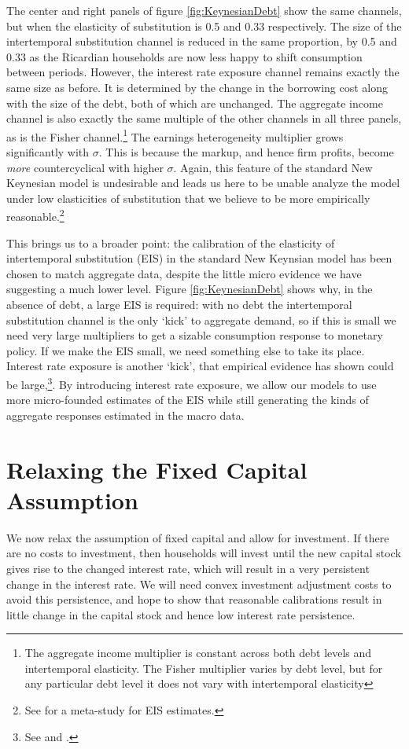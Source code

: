 \documentclass[titlepage]{\econtex}\newcommand{\texname}{ConsumptionHeterogeneity}
\begin{document}
The center and right panels of figure \ref{fig:KeynesianDebt} show the same channels, but when the elasticity of substitution is 0.5 and 0.33 respectively. The size of the intertemporal substitution channel is reduced in the same proportion, by 0.5 and 0.33 as the Ricardian households are now less happy to shift consumption between periods. However, the interest rate exposure channel remains exactly the same size as before. It is determined by the change in the borrowing cost along with the size of the debt, both of which are unchanged. The aggregate income channel is also exactly the same multiple of the other channels in all three panels, as is the Fisher channel.\footnote{The aggregate income multiplier is constant across both debt levels and intertemporal elasticity. The Fisher multiplier varies by debt level, but for any particular debt level it does not vary with intertemporal elasticity} The earnings heterogeneity multiplier grows significantly with $\sigma$. This is because the markup, and hence firm profits, become \textit{more} countercyclical with higher $\sigma$. Again, this feature of the standard New Keynesian model is undesirable and leads us here to be unable analyze the model under low elasticities of substitution that we believe to be more empirically reasonable.\footnote{See \cite{havranek_measuring_2015} for a meta-study for EIS estimates.}

This brings us to a broader point: the calibration of the elasticity of intertemporal substitution (EIS) in the standard New Keynsian model has been chosen to match aggregate data, despite the little micro evidence we have suggesting a much lower level. Figure \ref{fig:KeynesianDebt} shows why, in the absence of debt, a large EIS is required: with no debt the intertemporal substitution channel is the only `kick' to aggregate demand, so if this is small we need very large multipliers to get a sizable consumption response to monetary policy. If we make the EIS small, we need something else to take its place. Interest rate exposure is another `kick', that empirical evidence has shown could be large,\footnote{See \cite{auclert_monetary_2017} and \cite{ckConsumption}.}. By introducing interest rate exposure, we allow our models to use more micro-founded estimates of the EIS while still generating the kinds of aggregate responses estimated in the macro data.

\section{Relaxing the Fixed Capital Assumption}
We now relax the assumption of fixed capital and allow for investment. If there are no costs to investment, then households will invest until the new capital stock gives rise to the changed interest rate, which will result in a very persistent change in the interest rate. We will need convex investment adjustment costs to avoid this persistence, and hope to show that reasonable calibrations result in little change in the capital stock and hence low interest rate persistence.
\end{document}
